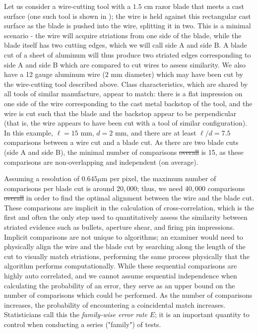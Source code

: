 \documentclass[9pt,twocolumn,twoside]{pnas-new}\usepackage[]{graphicx}\usepackage[dvipsnames]{xcolor}
\providecommand{\DIFadd}[1]{{\protect\color{blue}\uwave{#1}}} %
\providecommand{\DIFdel}[1]{{\protect\color{red}\sout{#1}}}                      %
\providecommand{\DIFaddbegin}{} %
\providecommand{\DIFaddend}{} %
\providecommand{\DIFdelbegin}{} %
\providecommand{\DIFdelend}{} %
\newcommand{\DIFscaledelfig}{0.5}
\newlength{\DIFdelgraphicswidth} %
\newlength{\DIFdelgraphicsheight} %
\newcommand{\DIFaddincludegraphics}[2][]{{\color{blue}\fbox{\DIFOincludegraphics[#1]{#2}}}} %
\newcommand{\DIFdelincludegraphics}[2][]{%
\sbox{\DIFdelgraphicsbox}{\DIFOincludegraphics[#1]{#2}}%
\settoboxwidth{\DIFdelgraphicswidth}{\DIFdelgraphicsbox} %
\settoboxtotalheight{\DIFdelgraphicsheight}{\DIFdelgraphicsbox} %
\scalebox{\DIFscaledelfig}{%
\parbox[b]{\DIFdelgraphicswidth}{\usebox{\DIFdelgraphicsbox}\\[-\baselineskip] \rule{\DIFdelgraphicswidth}{0em}}\llap{\resizebox{\DIFdelgraphicswidth}{\DIFdelgraphicsheight}{%
\setlength{\unitlength}{\DIFdelgraphicswidth}%
\begin{picture}(1,1)%
\thicklines\linethickness{2pt} %
{\color[rgb]{1,0,0}\put(0,0){\framebox(1,1){}}}%
{\color[rgb]{1,0,0}\put(0,0){\line( 1,1){1}}}%
{\color[rgb]{1,0,0}\put(0,1){\line(1,-1){1}}}%
\end{picture}%
}\hspace*{3pt}}} %
} %
\DeclareRobustCommand{\DIFaddbegin}{\DIFOaddbegin \let\includegraphics\DIFaddincludegraphics} %
\DeclareRobustCommand{\DIFaddend}{\DIFOaddend \let\includegraphics\DIFOincludegraphics} %
\DeclareRobustCommand{\DIFdelbegin}{\DIFOdelbegin \let\includegraphics\DIFdelincludegraphics} %
\DeclareRobustCommand{\DIFdelend}{\DIFOaddend \let\includegraphics\DIFOincludegraphics} %
\begin{document}
Let us consider a wire-cutting tool with a $1.5$ cm razor blade that meets a cast surface (one such tool is shown in ); the wire is held against this rectangular cast surface as the blade is pushed into the wire, splitting it in two.
This is a minimal scenario - the wire will acquire striations from one side of the blade, while the blade itself has two cutting edges, which we will call side A and side B.
A blade cut of a sheet of aluminum will thus produce two striated edges corresponding to side A and side B which are compared to cut wires to assess similarity.
We also have a 12 gauge aluminum wire ($2$ mm diameter) which may have been cut by the wire-cutting tool described above.
Class characteristics, which are shared by all tools of similar manufacture, appear to match:
there is a flat impression on one side of the wire corresponding to the cast metal backstop of the tool,
and the wire is cut such that the blade and the backstop appear to be perpendicular
(that is, the wire appears to have been cut with a tool of similar configuration).
In this example, \DIFdelbegin \DIFdel{$\ell = 15$ }\DIFdelend \DIFaddbegin \DIFadd{$b = 15$ }\DIFaddend mm, $d = 2$ mm, and there are at least \DIFdelbegin \DIFdel{$\ell/d = 7.5$ }\DIFdelend \DIFaddbegin \DIFadd{$b/d = 7.5$ }\DIFaddend comparisons between a wire cut and a blade cut.
As there are two blade cuts (side A and side B), the minimal number of comparisons \DIFdelbegin \DIFdel{overall }\DIFdelend is 15, as these comparisons are non-overlapping and independent (on average).

Assuming a resolution of $0.645 \mu$m per pixel, the maximum number of comparisons per blade cut is around $20,000$; thus, we need $40,000$ comparisons \DIFdelbegin \DIFdel{overall }\DIFdelend in order to find the optimal alignment between the wire and the blade cut.
These comparisons are implicit in the calculation of cross-correlation, which is the first and often the only step used to quantitatively assess the similarity between striated evidence such as bullets, aperture shear, and firing pin impressions.
Implicit comparisons are not unique to algorithms; an examiner would need to physically align the wire and the blade cut by searching along the length of the cut to visually match striations, performing the same process physically that the algorithm performs computationally.
While these sequential comparisons are highly auto correlated, and we cannot assume sequential independence when calculating the probability of an error, they serve as an upper bound on the number of comparisons which could be performed.
As the number of comparisons increases, the probability of encountering a coincidental match increases.
Statisticians call this the \textit{family-wise error rate} $E$; it is an important quantity to control when conducting a series ("family") of tests\DIFaddbegin \DIFadd{\mbox{%
\citep{tukey1953multiple}}\hskip0pt%
}\DIFaddend .
\end{document}
